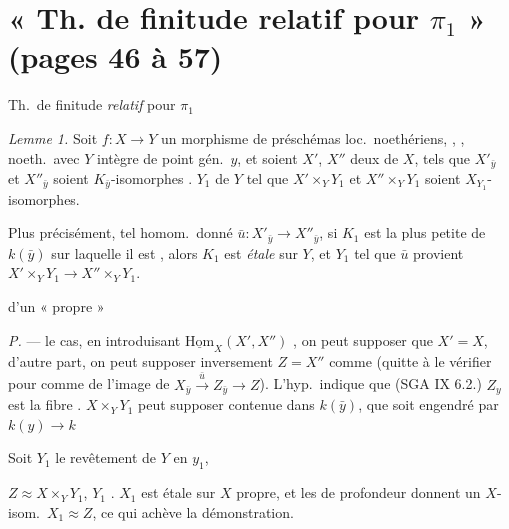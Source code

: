 \documentclass[11pt,a4paper]{article}
\begin{document}
\section*{« Th. de finitude relatif pour $\pi_1$ » (pages 46 à 57)}

Th.\ de finitude \emph{relatif} pour $\pi_1$


\struck{\ill{}}


\emph{Lemme 1.} Soit $f : X \to Y$ un morphisme \struck{\ill{}} de
préschémas loc.\ noethériens, ,
, \ill{} noeth.\ avec $Y$ intègre de point
gén.\ $y$, et  soient $X'$, $X''$ deux 
de $X$, tels que $X'_{\bar y}$ et $X''_{\bar y}$ soient
$K_{\bar y}$-isomorphes \ill{}.  $Y_1$ de $Y$ tel que $X' \times_Y Y_1$ et $X'' \times_Y Y_1$ soient
$X_{Y_1}$-isomorphes.

Plus précisément, \ill{} tel homom.\ donné
$\bar u : X'_{\bar y} \to X''_{\bar y}$, si $K_1$ est la plus petite
 de $k(\bar y)$ sur laquelle il est
, \ill{} alors  $K_1$ est \emph{étale} sur $Y$,
\ill{} et $Y_1$ \ill{} tel que $\bar u$ provient \ill{}
$X' \times_Y Y_1 \to X'' \times_Y Y_1$.

\ill{} d'un « propre » \ill{}

\emph{P.} --- \ill{} le cas, en introduisant $\underline{\mathrm{Hom}}_X(X', X'')$
, on peut supposer que
$X' = X$, d'autre part, on peut supposer inversement $Z = X''$ comme \ill{}
(quitte à le vérifier pour \ill{} comme \ill{} de l'image de
$X_{\bar y} \xrightarrow{\ \bar u\ } Z_{\bar y} \to Z$). L'hyp.\ indique que
(SGA IX 6.2.) $Z_y$ \ill{} est la fibre \ill{}. 
$X \times_Y Y_1$ \ill{} peut supposer contenue dans $k(\bar y)$, \ill{} que
\ill{} soit engendré par \ill{} $k(y) \to k$ \ill{}

Soit $Y_1$ le revêtement de $Y$ en $y_1$, \ill{}


$Z \approx X \times_Y Y_1$, $Y_1$ \ill{}. \ill{} $X_1$ est étale sur $X$
propre, et les \struck{\ill{}} \ill{} de profondeur \ill{} donnent un
$X$-isom.\ $X_1 \approx Z$, ce qui achève la démonstration.
\end{document}
